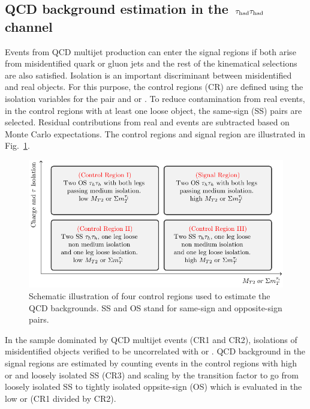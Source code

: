 \subsection{\texorpdfstring{QCD background estimation in the $\,\tau_{\rm had}\tau_{\rm had}$ channel}{QCD background estimation in the tau-tau channel}}
\label{sect:bkgQCD}
Events from QCD multijet production can enter the signal regions 
if both \Tau arise from misidentified quark or gluon jets
and the rest of the kinematical selections are also satisfied.  
Isolation is an important 
discriminant between misidentified and real \Tau objects. For this purpose, the control regions (CR) are defined using the isolation variables 
for the \Tau pair and \mttwo or \SumMT. To reduce contamination from real \tauTau events, 
in the control regions with at least one loose \Tau object, 
the same-sign (SS) pairs are selected. Residual contributions from real 
\tauTau and \wjets events are subtracted based on Monte Carlo expectations. The control regions and signal region are 
illustrated in Fig.~\ref{fig:ABCDQCD}. 
\begin{figure}[!htb]
\centering
\includegraphics[angle=0,scale=1]{Bkg/ABCD.pdf}
\caption{Schematic illustration of four control regions used to estimate the QCD backgrounds. SS and OS stand for same-sign and opposite-sign pairs.}
\label{fig:ABCDQCD}
\end{figure}
In the sample dominated by QCD multijet events (CR1 and CR2), isolations of misidentified \Tau objects verified 
to be uncorrelated with \mttwo or \SumMT.
QCD background in the signal regions are estimated by counting events in the control regions with high \mttwo or \SumMT  
and loosely isolated SS \tauTau (CR3)
and scaling by the transition factor to go from loosely isolated SS to tightly isolated oppsite-sign (OS) 
\tauTau which is evaluated in the low \mttwo or \SumMT (CR1 divided by CR2).

